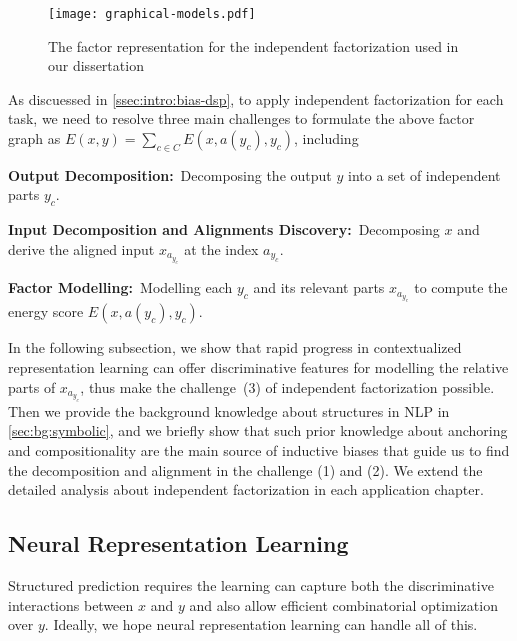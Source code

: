 \begin{figure}[!th]
\centering
\texttt{[image: graphical-models.pdf]}
\caption{\label{fig:bg:graphical-model}The factor representation for
  the independent factorization used in our dissertation}
\end{figure}

As discuessed in \autoref{ssec:intro:bias-dsp}, to apply independent
factorization for each task, we need to resolve three main challenges
to formulate the above factor graph as
$E(x, y) = \sum_{c \in C}E(x, a(y_{c}), y_{c})$, including
\begin{inparaenum}[(1)]
\item \textbf{Output Decomposition:}~Decomposing the output $y$ into a set of independent parts
  $y_{c}$.
\item \textbf{Input Decomposition and Alignments Discovery:}~Decomposing $x$ and derive the aligned input $x_{a_{y_{c}}}$ at
  the index $a_{y_{c}}$.
\item \textbf{Factor Modelling:}~Modelling each $y_{c}$ and its
  relevant parts $x_{a_{y_{c}}}$ to compute the energy score
  $E(x, a(y_{c}), y_{c})$.
\end{inparaenum}

In the following subsection, we show that rapid progress in
contextualized representation learning can offer discriminative
features for modelling the relative parts of $x_{a_{y_{c}}}$, thus
make the challenge~(3) of independent factorization possible. Then we
provide the background knowledge about structures in NLP in
\autoref{sec:bg:symbolic}, and we briefly show that such prior
knowledge about anchoring and compositionality are the main source of
inductive biases that guide us to find the decomposition and alignment
in the challenge (1) and (2). We extend the detailed analysis about
independent factorization in each application chapter.

\subsection{Neural Representation Learning}
\label{ssec:bg:rep-learning}

Structured prediction requires the learning can capture both the
discriminative interactions between $x$ and $y$ and also allow
efficient combinatorial optimization over $y$. Ideally, we hope neural
representation learning can handle all of this.

